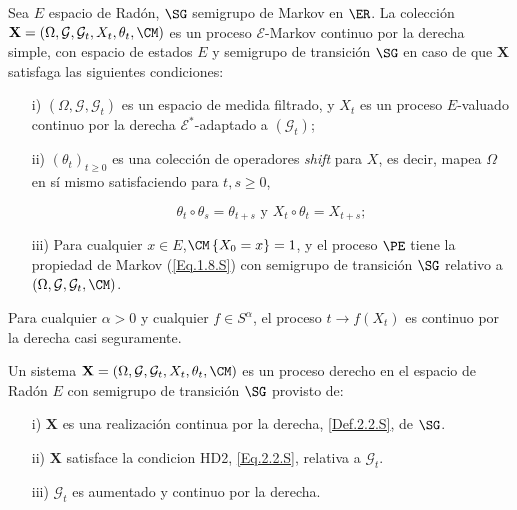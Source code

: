 \begin{Def}\label{Def.2.2.S}
Sea $E$ espacio de Rad\'on, $\SG$ semigrupo de Markov en $\ER$. La colecci\'on $\mathbf{X}=\left(\Omega,\mathcal{G},\mathcal{G}_{t},X_{t},\theta_{t},\CM\right)$ es un proceso $\mathcal{E}$-Markov continuo por la derecha simple, con espacio de estados $E$ y semigrupo de transici\'on $\SG$ en caso de que $\mathbf{X}$ satisfaga las siguientes condiciones:
\begin{itemize}
\item[i)] $\left(\Omega,\mathcal{G},\mathcal{G}_{t}\right)$ es un espacio de medida filtrado, y $X_{t}$ es un proceso $E$-valuado continuo por la derecha $\mathcal{E}^{*}$-adaptado a $\left(\mathcal{G}_{t}\right)$;

\item[ii)] $\left(\theta_{t}\right)_{t\geq0}$ es una colecci\'on de operadores {\em shift} para $X$, es decir, mapea $\Omega$ en s\'i mismo satisfaciendo para $t,s\geq0$,

\begin{equation}\label{Eq.Shift}
\theta_{t}\circ\theta_{s}=\theta_{t+s}\textrm{ y }X_{t}\circ\theta_{t}=X_{t+s};
\end{equation}

\item[iii)] Para cualquier $x\in E$,$\CM\left\{X_{0}=x\right\}=1$, y el proceso $\PE$ tiene la propiedad de Markov (\ref{Eq.1.8.S}) con semigrupo de transici\'on $\SG$ relativo a $\left(\Omega,\mathcal{G},\mathcal{G}_{t},\CM\right)$.
\end{itemize}
\end{Def}

\begin{Def}[HD2]\label{Eq.2.2.S}
Para cualquier $\alpha>0$ y cualquier $f\in S^{\alpha}$, el proceso $t\rightarrow f\left(X_{t}\right)$ es continuo por la derecha casi seguramente.
\end{Def}

\begin{Def}\label{Def.PD}
Un sistema $\mathbf{X}=\left(\Omega,\mathcal{G},\mathcal{G}_{t},X_{t},\theta_{t},\CM\right)$ es un proceso derecho en el espacio de Rad\'on $E$ con semigrupo de transici\'on $\SG$ provisto de:
\begin{itemize}
\item[i)] $\mathbf{X}$ es una realizaci\'on  continua por la derecha, \ref{Def.2.2.S}, de $\SG$.

\item[ii)] $\mathbf{X}$ satisface la condicion HD2, \ref{Eq.2.2.S}, relativa a $\mathcal{G}_{t}$.

\item[iii)] $\mathcal{G}_{t}$ es aumentado y continuo por la derecha.
\end{itemize}
\end{Def}


